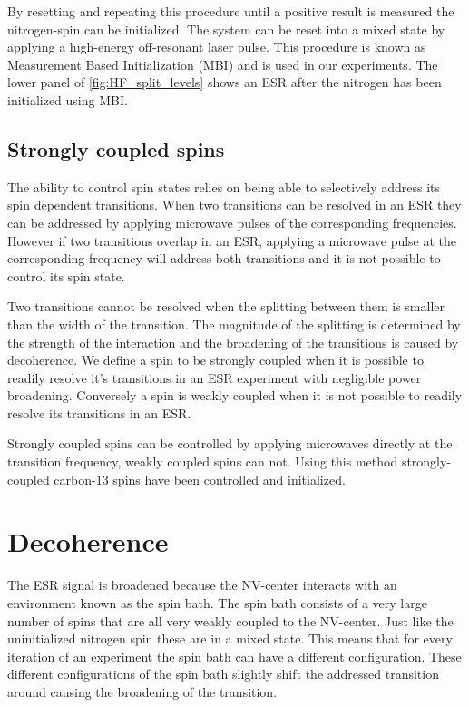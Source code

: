 By resetting and repeating this procedure until a positive result is measured the nitrogen-spin can be initialized.
The system can be reset into a mixed state by applying a high-energy off-resonant laser pulse.
This procedure is known as Measurement Based Initialization (MBI) and is used in our experiments.
The lower panel of \cref{fig:HF_split_levels} shows an ESR after the nitrogen has been initialized using MBI.

\subsection{Strongly coupled spins}
The ability to control spin states relies on being able to selectively address its spin dependent transitions.
When two transitions can be resolved in an ESR they can be addressed by applying microwave pulses of the corresponding frequencies.
However if two transitions overlap in an ESR, applying a microwave pulse at the corresponding frequency will address both transitions and it is not possible to control its spin state.

Two transitions cannot be resolved when the splitting between them is smaller than the width of the transition.
The magnitude of the splitting is determined by the strength of the interaction and the broadening of the transitions is caused by decoherence.
We define a spin to be strongly coupled when it is possible to readily resolve it's transitions in an ESR experiment with negligible power broadening.
Conversely a spin is weakly coupled when it is not possible to readily resolve its transitions in an ESR.

Strongly coupled spins can be controlled by applying microwaves directly at the transition frequency, weakly coupled spins can not.
Using this method strongly-coupled carbon-13 spins have been controlled and initialized\citep{Robledo2011HighFidelity}.

\section{Decoherence}
The ESR signal is broadened because the NV-center interacts with an environment known as the spin bath.
The spin bath consists of a very large number of spins that are all very weakly coupled to the NV-center.
Just like the uninitialized nitrogen spin these are in a mixed state.
This means that for every iteration of an experiment the spin bath can have a different configuration.
These different configurations of the spin bath slightly shift the addressed transition around causing the broadening of the transition.

